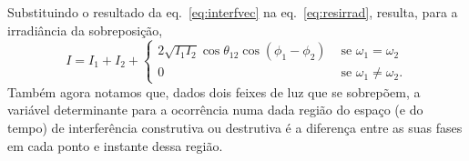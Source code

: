 Substituindo o resultado da eq.~\eqref{eq:interfvec} na eq.~\eqref{eq:resirrad},
resulta, para a irradiância da sobreposição,
\begin{equation}\label{eq:superp3}
  I=I_1+I_2+
  \begin{cases}
    2\sqrt{I_1I_2}\cos\theta_{12}\cos(\phi_1-\phi_2) & \text{ se
    }\omega_1=\omega_2\\
    0& \text{ se } \omega_1\neq\omega_2.
  \end{cases}
\end{equation}
Também agora notamos que, dados dois feixes de luz que se sobrepõem, a variável
determinante para a ocorrência numa dada região do espaço (e do tempo) de
interferência construtiva ou destrutiva é a diferença entre as suas fases em
cada ponto e instante dessa região.

